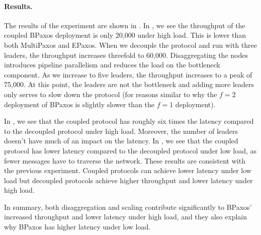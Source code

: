 \paragraph{Results.}
The results of the experiment are shown in . In
, we see the throughput of the coupled
BPaxos deployment is only 20,000 under high load. This is lower than both
MultiPaxos and EPaxos. When we decouple the protocol and run with three
leaders, the throughput increases threefold to 60,000. Disaggregating the nodes
introduces pipeline parallelism and reduces the load on the bottleneck
component. As we increase to five leaders, the throughput increases to a peak
of 75,000. At this point, the leaders are not the bottleneck and adding more
leaders only serves to slow down the protocol (for reasons similar to why the
$f=2$ deployment of BPaxos is slightly slower than the $f=1$ deployment).

In , we see that the coupled protocol has
roughly six times the latency compared to the decoupled protocol under high
load. Moreover, the number of leaders doesn't have much of an impact on the
latency. In , we see that the coupled
protocol has lower latency compared to the decoupled protocol under low load,
as fewer messages have to traverse the network. These results are consistent
with the previous experiment. Coupled protocols can achieve lower latency under
low load but decoupled protocols achieve higher throughput and lower latency
under high load.

In summary, both disaggregation and scaling contribute significantly to BPaxos'
increased throughput and lower latency under high load, and they also explain
why BPaxos has higher latency under low load.

%
%
